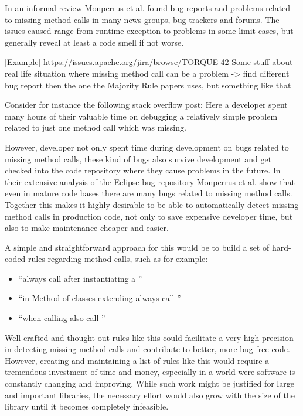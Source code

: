 In an informal review Monperrus et al. \cite{monperrus2010detecting} found bug reports and problems related to missing method calls in many news groups, bug trackers and forums.
The issues caused range from runtime exception to problems in some limit cases, but generally reveal at least a code smell if not worse.

[Example]
https://issues.apache.org/jira/browse/TORQUE-42
Some stuff about real life situation where missing method call can be a problem
-> find different bug report then the one the Majority Rule papers uses, but something like that

Consider for instance the following stack overflow post:
Here a developer spent many hours of their valuable time on debugging a relatively simple problem related to just one method call which was missing.

However, developer not only spent time during development on bugs related to missing method calls, these kind of bugs also survive development and get checked into the code repository where they cause problems in the future.
In their extensive analysis of the Eclipse bug repository Monperrus et al. \cite{monperrus2013detecting} show that even in mature code bases there are many bugs related to missing method calls.
Together this makes it highly desirable to be able to automatically detect missing method calls in production code, not only to save expensive developer time, but also to make maintenance cheaper and easier.

A simple and straightforward approach for this would be to build a set of hard-coded rules regarding method calls, such as for example:
\begin{itemize}
    \item ``always call  after instantiating a ''
    \item ``in Method  of classes extending  always call ''
    \item ``when calling  also call ''
\end{itemize}
Well crafted and thought-out rules like this could facilitate a very high precision in detecting missing method calls and contribute to better, more bug-free code.
However, creating and maintaining a list of rules like this would require a tremendous investment of time and money, especially in a world were software is constantly changing and improving.
While such work might be justified for large and important libraries, the necessary effort would also grow with the size of the library until it becomes completely infeasible.

